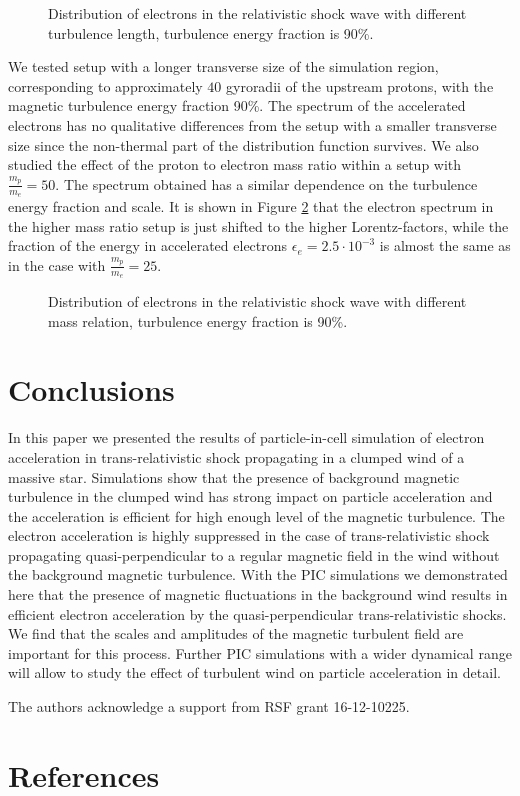 \documentclass[a4paper]{jpconf}
\begin{document}
\begin{figure}[h!]
	\centering
	\caption{Distribution of electrons in the relativistic shock wave with different turbulence length, turbulence energy fraction is 90\%.}
	\label{spectrum_length}
\end{figure} 

We tested setup with a longer transverse size of the simulation region, corresponding to approximately $40$ gyroradii of the upstream protons, with the magnetic turbulence energy fraction 90\%. The spectrum of the accelerated electrons has no qualitative differences from the setup with a smaller transverse size since the non-thermal part of the distribution function survives.  We also studied the effect of the proton to electron  mass ratio within a setup with  $\frac{m_p}{m_e} = 50$. The spectrum obtained has a similar dependence on the turbulence energy fraction and scale. It is shown in Figure \ref{electrons_mass} that the electron spectrum in the higher mass ratio setup is just shifted to the higher Lorentz-factors, while  the fraction of the energy in accelerated electrons  $\epsilon_e = 2.5\cdot10^{-3}$ is almost the same as in the case with $\frac{m_p}{m_e} = 25$.

\begin{figure}[h!]
	\centering
	\caption{Distribution of electrons in the relativistic shock wave with different mass relation, turbulence energy fraction is 90\%.}
	\label{electrons_mass}
\end{figure} 

\section{Conclusions}
In this paper we presented the results of particle-in-cell simulation of electron acceleration in trans-relativistic shock propagating in a clumped  wind of a massive star. Simulations show that the presence  of background  magnetic turbulence in the clumped wind has strong impact on particle acceleration and the acceleration is efficient for high enough level of the magnetic turbulence. The electron acceleration is highly suppressed in the case of  trans-relativistic shock propagating quasi-perpendicular to a regular magnetic field in the wind without the background magnetic turbulence. With the PIC simulations we demonstrated here that the presence of magnetic fluctuations in the background wind results in efficient electron acceleration by the quasi-perpendicular trans-relativistic shocks. We find that the scales and amplitudes of the magnetic turbulent field are important for this process. Further PIC simulations with a wider dynamical range will allow to study the effect of turbulent wind on particle acceleration in detail.

\ack
The authors acknowledge a support from RSF grant 16-12-10225.



\section*{References}



\end{document}
